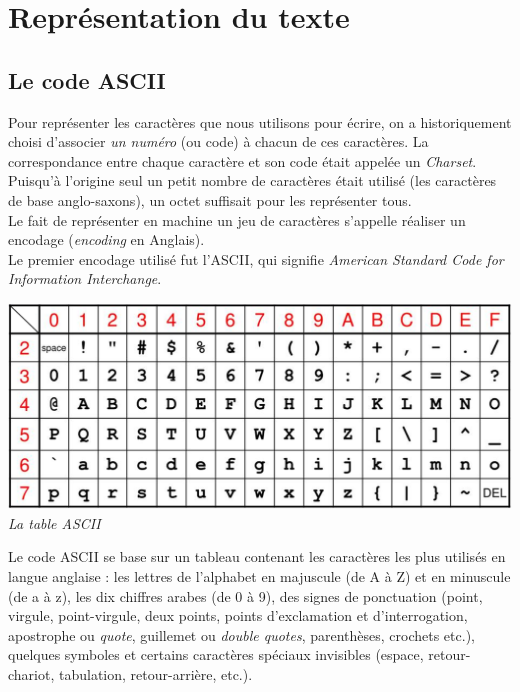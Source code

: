 \chapter{Représentation du texte}

\section{Le code ASCII}


Pour représenter les caractères que nous utilisons pour écrire, on a historiquement choisi d'associer \textit{un numéro} (ou code) à chacun de
ces caractères. La correspondance entre chaque caractère et son code était appelée un \textit{Charset}.\\
Puisqu'à l'origine seul un petit nombre de caractères était utilisé (les caractères de base anglo-saxons), un octet suffisait pour les
représenter tous.\\
Le fait de représenter en machine un jeu de caractères s'appelle réaliser un encodage (\textit{encoding} en Anglais).\\

Le premier encodage utilisé fut l'\textsc{ASCII}, qui signifie  \textit{American Standard Code for Information Interchange}.\\

\begin{center}
    \includegraphics[width=\columnwidth]{ch-texte/img/ASCII.png}\\
    \textit{La table ASCII}
\end{center}
Le code ASCII se base sur un tableau contenant les caractères les plus utilisés en langue anglaise : les lettres de l'alphabet en majuscule (de A
à Z) et en minuscule (de a à z),
les dix chiffres arabes (de 0 à 9), des signes de ponctuation (point, virgule, point-virgule, deux points, points d'exclamation et
d'interrogation, apostrophe ou \textit{quote}, guillemet
ou \textit{double quotes}, parenthèses, crochets etc.), quelques symboles et certains caractères spéciaux invisibles (espace, retour-chariot,
tabulation, retour-arrière, etc.).\\

